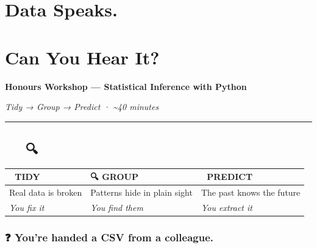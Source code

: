 \documentclass[
]{article}
\author{}
\date{\vspace{-2.5em}}
\begin{document}
\section{Data Speaks.}\label{data-speaks.}

\section{Can You Hear It?}\label{can-you-hear-it}

\textbf{Honours Workshop --- Statistical Inference with Python}

\emph{Tidy → Group → Predict · \textasciitilde40 minutes}

\begin{center}\rule{0.5\linewidth}{0.5pt}\end{center}

\subsection{🧹 ~ 🔍 ~ 🔮}\label{section}

\begin{longtable}[]{@{}
  >{\centering\arraybackslash}p{}
  >{\centering\arraybackslash}p{}
  >{\centering\arraybackslash}p{}@{}}
\toprule\noalign{}
\begin{minipage}[b]{\linewidth}\centering
🧹 \textbf{TIDY}
\end{minipage} & \begin{minipage}[b]{\linewidth}\centering
🔍 \textbf{GROUP}
\end{minipage} & \begin{minipage}[b]{\linewidth}\centering
🔮 \textbf{PREDICT}
\end{minipage} \\
\midrule\noalign{}
\endhead
\bottomrule\noalign{}
\endlastfoot
Real data is broken & Patterns hide in plain sight & The past knows the
future \\
\emph{You fix it} & \emph{You find them} & \emph{You extract it} \\
\end{longtable}

\subsubsection{❓ You're handed a CSV from a
colleague.}\label{youre-handed-a-csv-from-a-colleague.}
\end{document}
